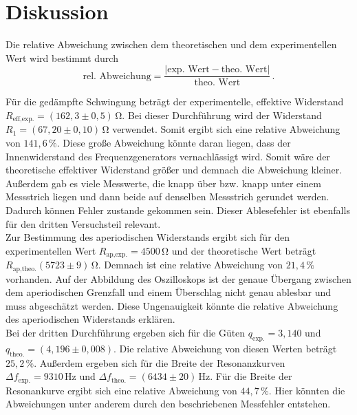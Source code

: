 \section{Diskussion}
\label{sec:Diskussion}
Die relative Abweichung zwischen dem theoretischen und dem experimentellen Wert wird bestimmt durch
$$\text{rel. Abweichung} = \frac{|\text{exp. Wert} - \text{theo. Wert}|}{\text{theo. Wert}}\,.$$

Für die gedämpfte Schwingung beträgt der experimentelle, effektive Widerstand $R_{\text{eff,exp.}} = \left(162,3 \pm 0,5\right)\,\unit{\ohm}$.
Bei dieser Durchführung wird der Widerstand $R_1 = \left(67,20 \pm 0,10\right)\,\unit{\ohm}$ verwendet. Somit ergibt sich eine relative Abweichung 
von $141,6\,\%$. Diese große Abweichung könnte daran liegen, dass der Innenwiderstand des Frequenzgenerators vernachlässigt wird. Somit wäre 
der theoretische effektiver Widerstand größer und demnach die Abweichung kleiner. Außerdem gab es viele Messwerte, die knapp über bzw. knapp unter einem Messstrich
liegen und dann beide auf denselben Messstrich gerundet werden. Dadurch können Fehler zustande gekommen sein. Dieser Ablesefehler ist ebenfalls für den dritten 
Versuchsteil relevant. \\
Zur Bestimmung des aperiodischen Widerstands ergibt sich für den experimentellen Wert $R_{\text{ap,exp.}} = 4500 \,\unit{\ohm}$ und der theoretische
Wert beträgt $R_{\text{ap,theo.}}\left(5723\pm9\right)\,\unit{\ohm}$. Demnach ist eine relative Abweichung von $21,4\,\%$ vorhanden. Auf der Abbildung des Oszilloskops
ist der genaue Übergang zwischen dem aperiodischen Grenzfall und einem Überschlag nicht genau ablesbar und muss abgeschätzt werden. Diese Ungenauigkeit könnte die relative Abweichung 
des aperiodischen Widerstands erklären.\\
Bei der dritten Durchführung ergeben sich für die Güten $q_{\text{exp.}} = 3,140 $ und $q_{\text{theo.}} =\left(4,196\pm0,008\right)$. Die relative Abweichung
von diesen Werten beträgt $25,2\,\%$. Außerdem ergeben sich für die Breite der Resonanzkurven $\Delta f_{\text{exp.}} =9310\,\unit{\hertz}$ und
$\Delta f_{\text{theo.}} =\left(6434\pm20\right)\,\unit{\hertz}$. Für die Breite der Resonankurve ergibt sich eine relative Abweichung von $44,7\,\%$.
Hier könnten die Abweichungen unter anderem durch den beschriebenen Messfehler entstehen. 

